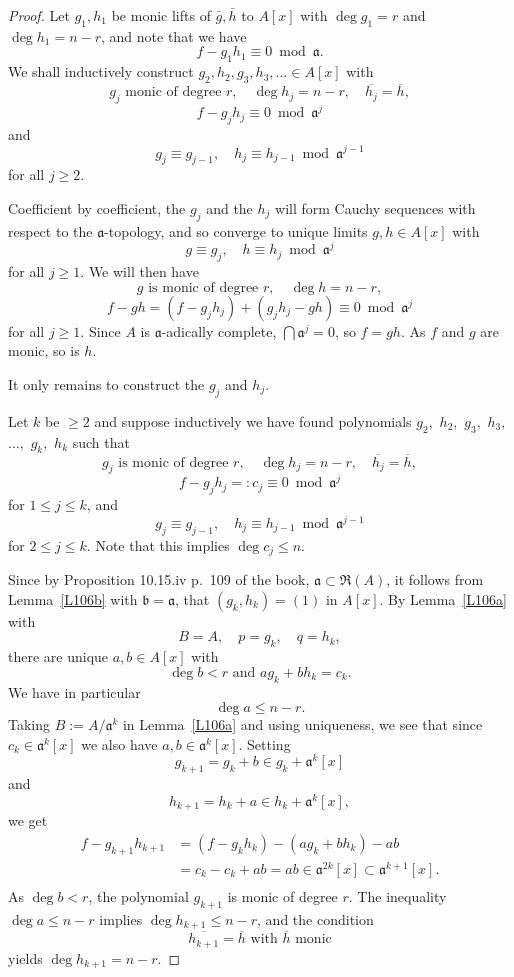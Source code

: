 \documentclass[parskip=half,fontsize=12pt]{scrartcl}%
\newcommand{\mf}{\mathfrak}
\newcommand{\aaa}{\mf a}
\newcommand{\bbb}{\mf b}
\begin{document}
\begin{proof}
Let $g_1,h_1$ be monic lifts of $\bar g,\bar h$ to $A[x]$ with $\deg g_1=r$ and $\deg h_1=n-r$, and note that we have 
$$
f-g_1h_1\equiv0\bmod\aaa.
$$ 
We shall inductively construct $g_2,h_2,g_3,h_3,\ldots\in A[x]$ with 
$$
g_j\text{ monic of degree }r,\quad\deg h_j=n-r,\quad\overline{h_j}=\overline h,%
$$ 
$$
f-g_jh_j\equiv0\bmod\aaa^j%
$$ 
and 
$$
g_j\equiv g_{j-1},\quad h_j\equiv h_{j-1}\bmod\aaa^{j-1}%
$$ 
for all $j\ge2$. 

Coefficient by coefficient, the $g_j$ and the $h_j$ will form Cauchy sequences with respect to the $\aaa$-topology, and so converge to unique limits $g,h\in A[x]$ with 
$$
g\equiv g_j,\quad h\equiv h_j\bmod\aaa^j
$$ 
for all $j\ge1$. We will then have 
$$
g\text{ is monic of degree }r,\quad\deg h=n-r,%
$$ 
$$
f-gh=(f-g_jh_j)+(g_jh_j-gh)\equiv0\bmod\aaa^j
$$ 
for all $j\ge1$. Since $A$ is $\aaa$-adically complete, $\bigcap\aaa^j=0$, so $f=gh$. As $f$ and $g$ are monic, so is $h$. 

It only remains to construct the $g_j$ and $h_j$. 

Let $k$ be $\ge2$ and suppose inductively we have found polynomials $g_2,$ $h_2,$ $g_3,$ $h_3,$ $\dots,$ $g_k,$ $h_k$ such that 
$$
g_j\text{ is monic of degree }r,\quad\deg h_j=n-r,\quad\overline{h_j}=\overline h,
$$ 
$$
f-g_jh_j=:c_j\equiv0\bmod\aaa^j
$$ 
for $1\le j\le k$, and 
$$
g_j\equiv g_{j-1},\quad h_j\equiv h_{j-1}\bmod\aaa^{j-1}
$$ 
for $2\le j\le k$. Note that this implies $\deg c_j\le n$. 

Since by Proposition 10.15.iv p.~109 of the book, $\aaa\subset\mf R(A)$, it follows from Lemma~\ref{L106b} with $\bbb=\aaa$, that $(g_k,h_k)=(1)$ in $A[x]$. By Lemma~\ref{L106a} with 
$$
B=A,\quad p=g_k,\quad q=h_k,
$$ 
there are unique $a,b\in A[x]$ with 
$$
\deg b<r\text{ and }ag_k+bh_k=c_k.
$$ 
We have in particular 
$$
\deg a\le n-r.
$$ 
Taking $B:=A/\aaa^k$ in Lemma~\ref{L106a} and using uniqueness, we see that since $c_k\in\aaa^k[x]$ we also have $a,b\in\aaa^k[x]$. %
Setting  
$$
g_{k+1}=g_k+b\in g_k+\aaa^k[x]
$$ 
and 
$$
h_{k+1}=h_k+a\in h_k+\aaa^k[x],
$$ 
we get 
\[
\begin{split}
f-g_{k+1}h_{k+1}&=(f-g_kh_k)-(ag_k+bh_k)-ab\\
&=c_k-c_k+ab=ab\in\aaa^{2k}[x]\subset\aaa^{k+1}[x].\\
\end{split} 
\] 
As $\deg b<r$, the polynomial $g_{k+1}$ is monic of degree $r$. %
The inequality $\deg a\le n-r$ implies $\deg h_{k+1}\le n-r$, and the condition 
$$
\overline{h_{k+1}}=\overline h\text{ with }\overline h\text{ monic}
$$ 
yields $\deg h_{k+1}=n-r$. %
\end{proof}
\end{document}
